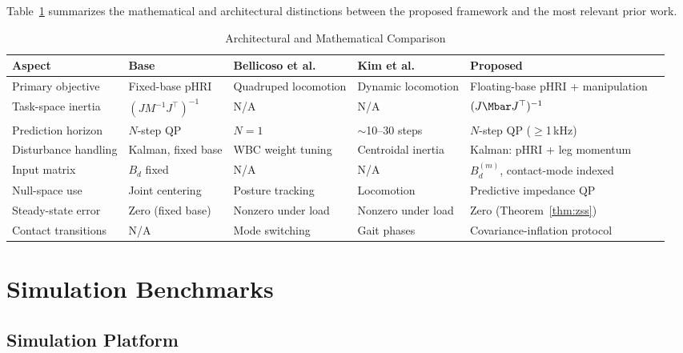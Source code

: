 Table~\ref{tab:comparison} summarizes the mathematical and architectural
distinctions between the proposed framework and the most relevant prior
work.

\begin{table}[!t]
\caption{Architectural and Mathematical Comparison}
\label{tab:comparison}
\renewcommand{\arraystretch}{1.3}
\begin{tabular*}{\textwidth}{@{\extracolsep{\fill}}llllll}
\toprule
\textbf{Aspect} & \textbf{Base \cite{cao2026impedance}} & \textbf{Bellicoso et al.\ \cite{bellicoso2016perception}} & \textbf{Kim et al.\ \cite{kim2019highly}} & \textbf{Proposed} \\
\midrule
Primary objective    & Fixed-base pHRI           & Quadruped locomotion  & Dynamic locomotion    & Floating-base pHRI + manipulation \\
Task-space inertia   & $(JM^{-1}J^\top)^{-1}$   & N/A                   & N/A                   & $(J\Mbar J^\top)^{-1}$ \\
Prediction horizon   & $N$-step QP               & $N=1$                 & $\sim$10--30 steps    & $N$-step QP (${\geq}$1\,kHz) \\
Disturbance handling & Kalman, fixed base        & WBC weight tuning     & Centroidal inertia    & Kalman: pHRI + leg momentum \\
Input matrix         & $B_d$ fixed               & N/A                   & N/A                   & $B_d^{(m)}$, contact-mode indexed \\
Null-space use       & Joint centering           & Posture tracking      & Locomotion            & Predictive impedance QP \\
Steady-state error   & Zero (fixed base)         & Nonzero under load    & Nonzero under load    & Zero (Theorem~\ref{thm:zss}) \\
Contact transitions  & N/A                       & Mode switching        & Gait phases           & Covariance-inflation protocol \\
\bottomrule
\end{tabular*}
\end{table}

\section{Simulation Benchmarks}\label{sec:simulation}

\subsection{Simulation Platform}


